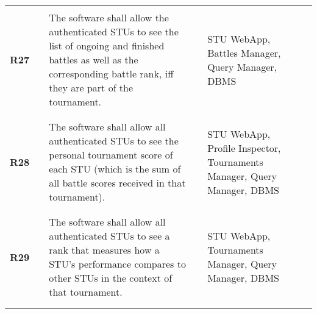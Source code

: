 \begin{longtable}[H]{l l p{6cm} l p{4cm} l}
                            &        &                                                                                                                                                                                                                                                                              &        &       \\\hline  & & \\ 
    \textbf{R27}            & \vline & The software shall allow the authenticated STUs to see the list of ongoing and finished battles as well as the corresponding battle rank, iff they are part of the tournament.                                                                                               & \vline &  STU WebApp, Battles Manager, Query Manager, DBMS \\          
                            &        &                                                                                                                                                                                                                                                                              &        &       \\\hline  & & \\ 
    \textbf{R28}            & \vline & The software shall allow all authenticated STUs to see the personal tournament score of each STU (which is the sum of all battle scores received in that tournament).                                                                                                        & \vline &  STU WebApp, Profile Inspector, Tournaments Manager, Query Manager, DBMS \\          
                            &        &                                                                                                                                                                                                                                                                              &        &       \\\hline  & & \\ 
    \textbf{R29}            & \vline & The software shall allow all authenticated STUs to see a rank that measures how a STU's performance compares to other STUs in the context of that tournament.                                                                                                                & \vline &  STU WebApp, Tournaments Manager, Query Manager, DBMS \\          
                            &        &                                                                                                                                                                                                                                                                              &        &       \\\hline  & & \\ 

\end{longtable}
